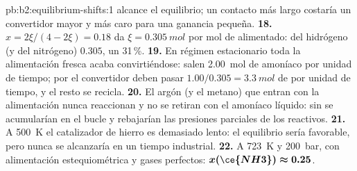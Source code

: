 \begin{solution}{pb:b2:equilibrium-shifts:1}
alcance el equilibrio; un contacto más largo costaría un convertidor mayor y más
caro para una ganancia pequeña.
\textbf{18.} $x = 2\xi/(4 - 2\xi) = 0.18$ da $\xi = \qty{0.305}{mol}$ por
mol de  alimentado:  del hidrógeno (y del nitrógeno)
$0.305$, un 31\,\%.
\textbf{19.} En régimen estacionario toda la alimentación fresca acaba convirtiéndose:
salen \qty{2.00}{mol} de amoníaco por unidad de tiempo; por el convertidor deben pasar $1.00/
0.305 = \qty{3.3}{mol}$ de  por unidad de tiempo, y el resto se recicla.
\textbf{20.} El argón (y el metano) que entran con la alimentación nunca reaccionan y
no se retiran con el amoníaco líquido: sin  se
acumularían en el bucle y rebajarían las presiones parciales de los reactivos.
\textbf{21.} A \qty{500}{K} el catalizador de hierro es demasiado lento: el equilibrio
sería favorable, pero nunca se alcanzaría en un tiempo industrial.
\textbf{22.} A \qty{723}{K} y \qty{200}{bar}, con alimentación estequiométrica y gases
perfectos: $\boldsymbol{x(\ce{NH3}) \approx 0.25}$.
\end{solution}
